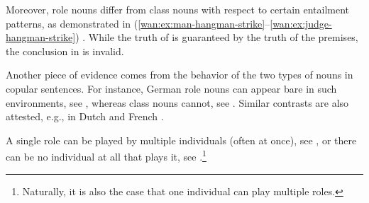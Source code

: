\documentclass[output=paper]{langscibook}
\begin{document}
		\ea\judgewidth{\#}\label{wan:ex:judge-man-earn} \label{wan:ex:judge-earn}
		\label{wan:ex:man-earn}
		\z
        \z

\noindent Moreover, role nouns differ from class nouns with respect to certain entailment patterns, as demonstrated in (\ref{wan:ex:man-hangman-strike}--\ref{wan:ex:judge-hangman-strike}) \citep[see][]{landman1989groupsii}. While the truth of  is guaranteed by the truth of the premises, the conclusion in  is invalid. 
		
		\ea\judgewidth{$\vDash$}\label{wan:ex:man-hangman-strike} \label{wan:ex:man-strike}
		\label{wan:ex:man-hangman}
		\label{wan:ex:hangman-strike}
		\z
		\ex\label{wan:ex:judge-hangman-strike} \label{wan:ex:judge-strike}
		\label{wan:ex:judge-hangman}
		\label{wan:ex:hangman-strike-role}
		\z
		\z

\noindent Another piece of evidence comes from the behavior of the two types of nouns in copular sentences. For instance, German role nouns can appear bare in such environments, see , whereas class nouns cannot, see . Similar contrasts are also attested, e.g., in Dutch and French \citep{de-swart_winter_zwarts2007bare}. 

\ea\label{wan:ex:article-judge-man} \label{wan:ex:article-judge}
\label{wan:ex:article-man}
\z
\z

\noindent A single role can be played by multiple individuals (often at once), see , or there can be no individual at all that plays it, see .\footnote{Naturally, it is also the case that one individual can play multiple roles.}
		
\end{document}
